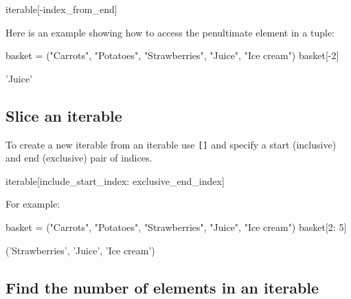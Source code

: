 \begin{api}
iterable[-index_from_end]
\end{api}



Here is an example showing how to access the penultimate element in a tuple:




\begin{pyin}
basket = ("Carrots", "Potatoes", "Strawberries", "Juice", "Ice cream")
basket[-2]
\end{pyin}





\begin{raw}
'Juice'
\end{raw}





\subsection{Slice an iterable}
\label{sec:slice_an_iterable}

To create a new iterable from an iterable use \texttt{[]} and specify a start
(inclusive) and end (exclusive) pair of indices.


\begin{api}
iterable[include_start_index: exclusive_end_index]
\end{api}



For example:




\begin{pyin}
basket = ("Carrots", "Potatoes", "Strawberries", "Juice", "Ice cream")
basket[2: 5]
\end{pyin}





\begin{raw}
('Strawberries', 'Juice', 'Ice cream')
\end{raw}





\subsection{Find the number of elements in an iterable}
\label{\detokenize{building-tools/02-functions-and-data-structures/how/main:find-the-number-of-elements-in-an-iterable}}\label{\detokenize{building-tools/02-functions-and-data-structures/how/main:id3}}

